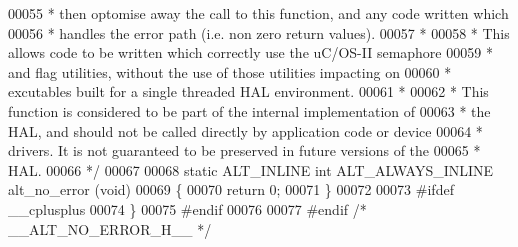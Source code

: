 \begin{DoxyCode}
00055 \textcolor{comment}{ * then optomise away the call to this function, and any code written which}
00056 \textcolor{comment}{ * handles the error path (i.e. non zero return values). }
00057 \textcolor{comment}{ *}
00058 \textcolor{comment}{ * This allows code to be written which correctly use the uC/OS-II semaphore}
00059 \textcolor{comment}{ * and flag utilities, without the use of those utilities impacting on }
00060 \textcolor{comment}{ * excutables built for a single threaded HAL environment.}
00061 \textcolor{comment}{ *}
00062 \textcolor{comment}{ * This function is considered to be part of the internal implementation of}
00063 \textcolor{comment}{ * the HAL, and should not be called directly by application code or device}
00064 \textcolor{comment}{ * drivers. It is not guaranteed to be preserved in future versions of the}
00065 \textcolor{comment}{ * HAL.}
00066 \textcolor{comment}{ */}
00067 
00068 \textcolor{keyword}{static} ALT_INLINE \textcolor{keywordtype}{int} ALT_ALWAYS_INLINE alt_no_error (\textcolor{keywordtype}{void})
00069 \{
00070   \textcolor{keywordflow}{return} 0;
00071 \}
00072 
00073 \textcolor{preprocessor}{#ifdef \_\_cplusplus}
00074 \}
00075 \textcolor{preprocessor}{#endif}
00076 
00077 \textcolor{preprocessor}{#endif }\textcolor{comment}{/* \_\_ALT\_NO\_ERROR\_H\_\_ */}\textcolor{preprocessor}{}
\end{DoxyCode}
